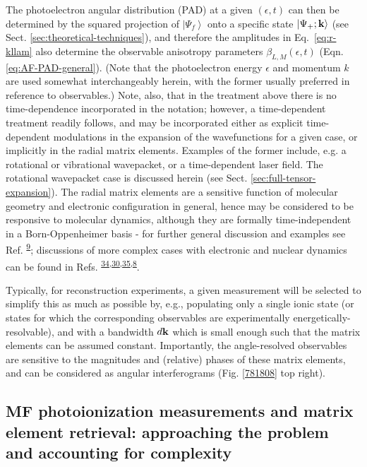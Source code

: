\documentclass[10pt]{article}
\begin{document}
The photoelectron angular distribution (PAD) at a given $(\epsilon,t)$ can then be determined by the squared projection of $\left|\Psi_f\right>$ onto a specific state $\left|\Psi_{+};\bf{k}\right>$ (see Sect. \ref{sec:theoretical-techniques}), and therefore the amplitudes in Eq.~\ref{eq:r-kllam} also determine the observable anisotropy parameters $\beta_{L,M}(\epsilon,t)$ (Eqn. \ref{eq:AF-PAD-general}). (Note that the photoelectron energy $\epsilon$ and momentum $k$ are used somewhat interchangeably herein, with the former usually preferred in reference to observables.) Note, also, that in the treatment above there is no time-dependence incorporated in the notation; however, a time-dependent treatment readily follows, and may be incorporated either as explicit time-dependent modulations in the expansion of the wavefunctions for a given case, or implicitly in the radial matrix elements. Examples of the former include, e.g. a rotational or vibrational wavepacket, or a time-dependent laser field. The rotational wavepacket case is discussed herein (see Sect. \ref{sec:full-tensor-expansion}). The radial matrix elements are a sensitive function of molecular geometry and electronic configuration in general, hence may be considered to be responsive to molecular dynamics, although they are formally time-independent in a Born-Oppenheimer basis - for further general discussion and examples see Ref. \textsuperscript{\hyperref[csl:9]{9}}; discussions of more complex cases with electronic and nuclear dynamics can be found in Refs.  \textsuperscript{\hyperref[csl:34]{34},\hyperref[csl:30]{30},\hyperref[csl:35]{35},\hyperref[csl:8]{8}}.

Typically, for reconstruction experiments, a given measurement will be selected to simplify this as much as possible by, e.g., populating only a single ionic state (or states for which the corresponding observables are experimentally energetically-resolvable), and with a bandwidth $d\bf{k}$ which is small enough such that the matrix elements can be assumed constant. Importantly, the angle-resolved observables are sensitive to the magnitudes and (relative) phases of these matrix elements, and can be considered as angular interferograms (Fig. \ref{781808} top right).


\subsection{MF photoionization measurements and matrix element retrieval: approaching the problem and accounting for complexity\label{sec:MF-recon-basic-intro}}
\end{document}
